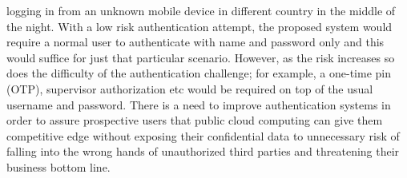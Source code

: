 \documentclass[11pt]{article}
\begin{document}
logging in from an unknown mobile device in different country in the middle of the night. With a low risk authentication attempt, the
proposed system would require a normal user to authenticate with name and password only and this would suffice for just that particular
scenario. However, as the risk increases so does the difficulty of the authentication challenge; for example, a one-time pin (OTP),
supervisor authorization etc would be required on top of the usual username and password. There is a need to improve authentication
systems in order to assure prospective users that public cloud computing can give them competitive edge without exposing their confidential
data to unnecessary risk of falling into the wrong hands of unauthorized third parties and threatening their business bottom line.\\
\end{document}
